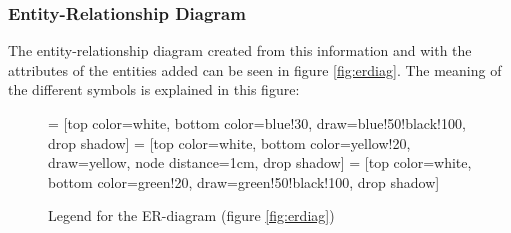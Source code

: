 \documentclass[12pt, a4paper,titlepage]{article}
\begin{document}
\subsubsection{Entity-Relationship Diagram}
The entity-relationship diagram created from this information and with the
attributes of the entities added can be seen in figure \ref{fig:erdiag}. 
The meaning of the different symbols is explained in this figure:
\begin{figure}[H]
\centering
{} = [top color=white, bottom color=blue!30, 
                            draw=blue!50!black!100, drop shadow]
 = [top color=white, bottom color=yellow!20, 
                               draw=yellow, node distance=1cm, drop shadow]
 = [top color=white, bottom color=green!20, 
                                  draw=green!50!black!100, drop shadow]
\caption{Legend for the ER-diagram (figure \ref{fig:erdiag})}
\end{figure}
\end{document}
